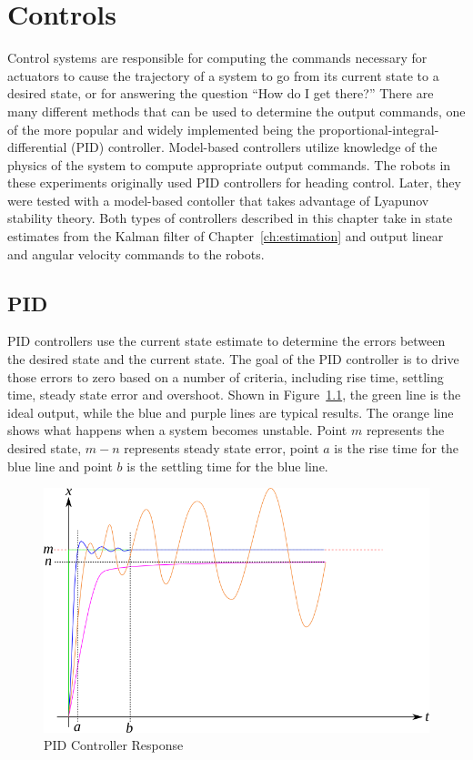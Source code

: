 \chapter{Controls}%
\label{ch:controls}
Control systems are responsible for computing the commands necessary for actuators to cause the trajectory of a system to go from its current state to a desired state, or for answering the question ``How do I get there?'' There are many different methods that can be used to determine the output commands, one of the more popular and widely implemented being the proportional-integral-differential (PID) controller. Model-based controllers utilize knowledge of the physics of the system to compute appropriate output commands. The robots in these experiments originally used PID controllers for heading control. Later, they were tested with a model-based contoller that takes advantage of Lyapunov stability theory. Both types of controllers described in this chapter take in state estimates from the Kalman filter of Chapter~\ref{ch:estimation} and output linear and angular velocity commands to the robots.

\section{PID}%
\label{sec:pid}
PID controllers use the current state estimate to determine the errors between the desired state and the current state. The goal of the PID controller is to drive those errors to zero based on a number of criteria, including rise time, settling time, steady state error and overshoot. Shown in Figure~\ref{fig:pid}, the green line is the ideal output, while the blue and purple lines are typical results. The orange line shows what happens when a system becomes unstable. Point $m$ represents the desired state, $m-n$ represents steady state error, point $a$ is the rise time for the blue line and point $b$ is the settling time for the blue line.

\begin{figure}[ht!]
\centering
\includegraphics[width=.85\textwidth]{images/pid}
\caption{PID Controller Response}%
\label{fig:pid}
\end{figure}

